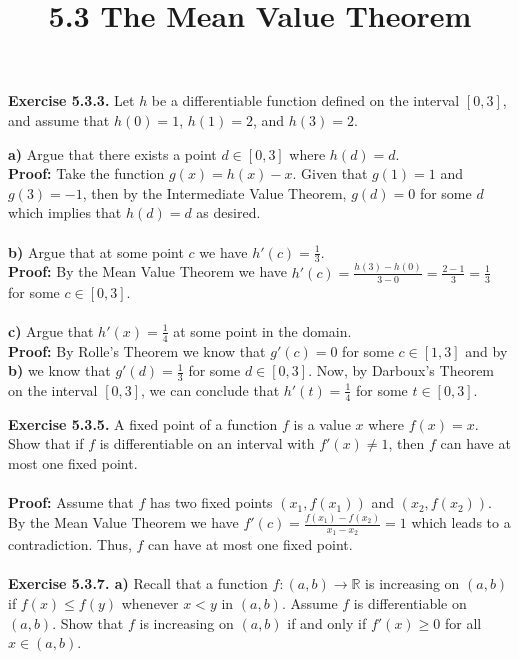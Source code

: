 \documentclass{article}
\title{\textbf{5.3 The Mean Value Theorem}}
\begin{document}
	\maketitle
	\textbf{Exercise 5.3.3.} Let $h$ be a differentiable function defined on the interval $[0, 3]$, and assume that $h(0) = 1$, $h(1) = 2$, and $h(3) = 2$.
	\begin{itemize}
		\textbf{a)} Argue that there exists a point $d \in [0, 3]$ where $h(d) = d$. \\
		\textbf{Proof:} Take the function $g(x) = h(x) - x$. Given that $g(1) = 1$ and $g(3) = -1$, then by the Intermediate Value Theorem, $g(d) = 0$ for some $d$ which implies that $h(d) = d$ as desired. \\ \\
		\textbf{b)} Argue that at some point $c$ we have $h'(c) = \frac{1}{3}$. \\
		\textbf{Proof:} By the Mean Value Theorem we have $h'(c) = \frac{h(3) - h(0)}{3 - 0} = \frac{2 - 1}{3} = \frac{1}{3}$ for some $c \in [0, 3]$.\\ \\
		\textbf{c)} Argue that $h'(x) = \frac{1}{4}$ at some point in the domain. \\
		\textbf{Proof:} By Rolle's Theorem we know that $g'(c) = 0$ for some $c \in [1, 3]$ and by \textbf{b)} we know that $g'(d) = \frac{1}{3}$ for some $d \in [0, 3]$. Now, by Darboux's Theorem on the interval $[0, 3]$, we can conclude that $h'(t) = \frac{1}{4}$ for some $t \in [0, 3]$.
	\end{itemize}
	\textbf{Exercise 5.3.5.} A fixed point of a function $f$ is a value $x$ where $f(x) = x$. Show that if $f$ is differentiable on an interval with $f'(x) \neq 1$, then $f$ can have at most one fixed point. \\ \\
	\textbf{Proof:} Assume that $f$ has two fixed points $(x_1, f(x_1))$ and $(x_2, f(x_2))$. By the Mean Value Theorem we have $f'(c) = \frac{f(x_1) - f(x_2)}{x_1 - x_2} = 1$ which leads to a contradiction. Thus, $f$ can have at most one fixed point. \\ \\
	\textbf{Exercise 5.3.7. a)} Recall that a function $f : (a, b) \to \mathbb{R}$ is increasing on $(a, b)$ if $f(x) \leq f(y)$ whenever $x < y$ in $(a, b)$. Assume $f$ is differentiable on $(a, b)$. Show that $f$ is increasing on $(a, b)$ if and only if $f'(x) \geq 0$ for all $x \in (a, b)$. \\ \\
\end{document}
